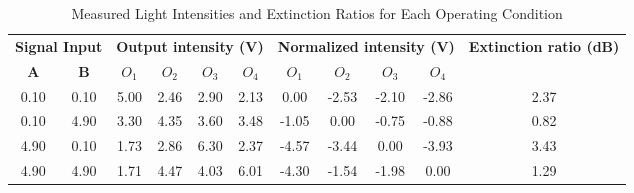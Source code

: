 \documentclass{article}
\begin{document}
\begin{table}[ht]
\centering
\caption{Measured Light Intensities and Extinction Ratios for Each Operating Condition}
\label{tab:extinction_ratios}
\begin{adjustbox}{max width=\textwidth}
\begin{tabular}{cc|cccc|cccc|c}
\toprule
\multicolumn{2}{c|}{\textbf{Signal Input}} & \multicolumn{4}{c|}{\textbf{Output intensity (V)}} & \multicolumn{4}{c|}{\textbf{Normalized intensity (V)}} & \multirow{2}{*}{\textbf{Extinction ratio (dB)}} \\
\cmidrule{1-10}
\textbf{A} & \textbf{B} & $O_1$ & $O_2$ & $O_3$ & $O_4$ & $O_1$ & $O_2$ & $O_3$ & $O_4$ & \\
\midrule
0.10 & 0.10 & 5.00 & 2.46 & 2.90 & 2.13 & 0.00 & -2.53 & -2.10 & -2.86 & 2.37 \\
0.10 & 4.90 & 3.30 & 4.35 & 3.60 & 3.48 & -1.05 & 0.00 & -0.75 & -0.88 & 0.82 \\
4.90 & 0.10 & 1.73 & 2.86 & 6.30 & 2.37 & -4.57 & -3.44 & 0.00 & -3.93 & 3.43 \\
4.90 & 4.90 & 1.71 & 4.47 & 4.03 & 6.01 & -4.30 & -1.54 & -1.98 & 0.00 & 1.29 \\
\bottomrule
\end{tabular}
\end{adjustbox}
\end{table}
\end{document}
